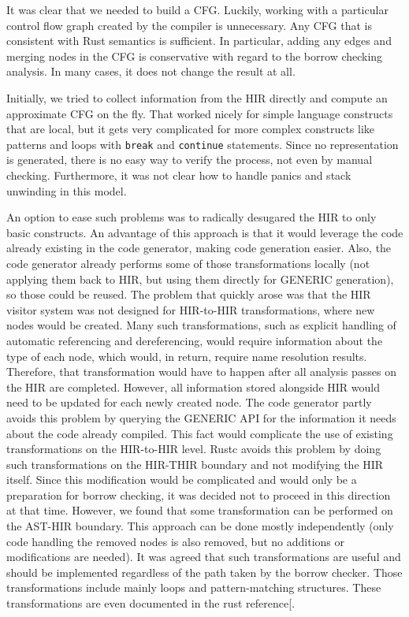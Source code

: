 \documentclass[
  11pt,
  twoside]{report}
\begin{document}
It was clear that we needed to build a CFG. Luckily, working with a
particular control flow graph created by the compiler is unnecessary.
Any CFG that is consistent with Rust semantics is sufficient. In
particular, adding any edges and merging nodes in the CFG is
conservative with regard to the borrow checking analysis. In many cases,
it does not change the result at all.

Initially, we tried to collect information from the HIR directly and
compute an approximate CFG on the fly. That worked nicely for simple
language constructs that are local, but it gets very complicated for
more complex constructs like patterns and loops with \texttt{break} and
\texttt{continue} statements. Since no representation is generated,
there is no easy way to verify the process, not even by manual checking.
Furthermore, it was not clear how to handle panics and stack unwinding
in this model.

An option to ease such problems was to radically desugared the HIR to
only basic constructs. An advantage of this approach is that it would
leverage the code already existing in the code generator, making code
generation easier. Also, the code generator already performs some of
those transformations locally (not applying them back to HIR, but using
them directly for GENERIC generation), so those could be reused. The
problem that quickly arose was that the HIR visitor system was not
designed for HIR-to-HIR transformations, where new nodes would be
created. Many such transformations, such as explicit handling of
automatic referencing and dereferencing, would require information about
the type of each node, which would, in return, require name resolution
results. Therefore, that transformation would have to happen after all
analysis passes on the HIR are completed. However, all information
stored alongside HIR would need to be updated for each newly created
node. The code generator partly avoids this problem by querying the
GENERIC API for the information it needs about the code already
compiled. This fact would complicate the use of existing transformations
on the HIR-to-HIR level. Rustc avoids this problem by doing such
transformations on the HIR-THIR boundary and not modifying the HIR
itself. Since this modification would be complicated and would only be a
preparation for borrow checking, it was decided not to proceed in this
direction at that time. However, we found that some transformation can
be performed on the AST-HIR boundary. This approach can be done mostly
independently (only code handling the removed nodes is also removed, but
no additions or modifications are needed). It was agreed that such
transformations are useful and should be implemented regardless of the
path taken by the borrow checker. Those transformations include mainly
loops and pattern-matching structures. These transformations are even
documented in the rust reference{[}\citeproc{ref-reference}{14}{]}.
\end{document}
